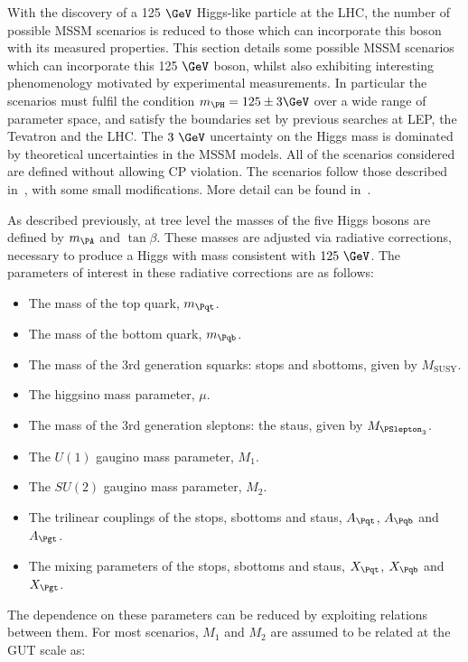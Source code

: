 With the discovery of a 125$~\GeV$ Higgs-like particle at the LHC, the number of
possible MSSM scenarios is reduced to those which can incorporate this boson
with its measured properties. This section details some possible MSSM scenarios
which can incorporate this 125$~\GeV$ boson, whilst also exhibiting interesting
phenomenology motivated by experimental measurements. In particular the
scenarios must fulfil the condition $m_{\PH} = 125 \pm 3 \GeV$ over a wide range
of parameter space, and satisfy the boundaries set by previous searches at LEP,
the Tevatron and the LHC. The $3~\GeV$ uncertainty on the Higgs mass is
dominated by theoretical uncertainties in the MSSM models. All of the scenarios 
considered are defined without allowing CP violation. The scenarios follow those
described in~\cite{MSSMScenarios}, with some small modifications. More detail
can be found in~\cite{HIG-14-021}. 

As described previously, at tree level the masses of the five Higgs bosons are
defined by $m_{\PA}$ and $\tan\beta$. These masses are adjusted via radiative
corrections, necessary to produce a Higgs with mass consistent with $125~\GeV$.
The parameters of interest in these radiative corrections are as follows:

\begin{itemize}
\item The mass of the top quark, $m_{\Pqt}$.
\item The mass of the bottom quark, $m_{\Pqb}$.
\item The mass of the 3rd generation squarks: stops and sbottoms, given by
$M_{\text{SUSY}}$.
\item The higgsino mass parameter, $\mu$.
\item The mass of the 3rd generation sleptons: the staus, given by
$M_{\PSlepton_{3}}$.
\item The $U(1)$ gaugino mass parameter, $M_{1}$.
\item The $SU(2)$ gaugino mass parameter, $M_{2}$.
\item The trilinear couplings of the stops, sbottoms and staus, $A_{\Pqt}$,
$A_{\Pqb}$ and $A_{\Pgt}$.
\item The mixing parameters of the stops, sbottoms and staus, $X_{\Pqt}$,
$X_{\Pqb}$ and $X_{\Pgt}$.
\end{itemize}

The dependence on these parameters can be reduced by exploiting relations
between them. For most scenarios, $M_{1}$ and $M_{2}$ are assumed to be related
at the GUT scale as:

